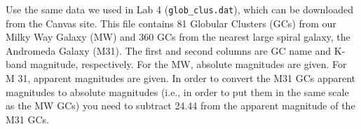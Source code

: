 \documentclass[10pt, physics]{homework}
\begin{document}
	\begin{problem}
		Use the same data we used in Lab 4 (\texttt{glob\_clus.dat}), which can be downloaded from the Canvas site. This file contains 81 Globular Clusters (GCs) from our Milky Way Galaxy (MW) and 360 GCs from the nearest large spiral galaxy, the Andromeda Galaxy (M31). The first and second columns are GC name and K-band magnitude, respectively. For the MW, absolute magnitudes are given. For M 31, apparent magnitudes are given. In order to convert the M31 GCs apparent magnitudes to absolute magnitudes (i.e., in order to put them in the same scale as the MW GCs) you need to subtract 24.44 from the apparent magnitude of the M31 GCs.
	\end{problem}
\end{document}
